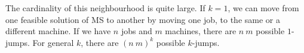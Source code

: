 \documentclass[12pt,a4paper,reqno]{article}
\begin{document}
The cardinality of this neighbourhood is quite large. If $k=1$, we can move from one feasible solution of MS to another by moving one job, to the same or a different machine. If we have $n$ jobs and $m$ machines, there are $n \> m$ possible $1$-jumps. For general $k$, there are $(n \> m)^k$ possible $k$-jumps.

\end{document}
